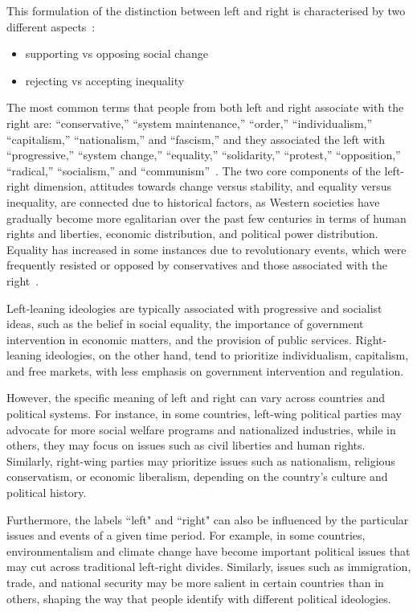 This formulation of the distinction between left and right is characterised by
two different aspects~\citep{jost2018political}:
\begin{itemize}
    \item supporting vs opposing social change
    \item rejecting vs accepting inequality
\end{itemize}
The most common terms that people from both left and right associate with the right are: “conservative,” “system maintenance,” “order,” “individualism,” “capitalism,” “nationalism,” and “fascism,” and they associated the left with “progressive,” “system change,” “equality,” “solidarity,” “protest,” “opposition,” “radical,” “socialism,” and “communism”~\citep[p.~213-14]{fuchs1990}.
The two core components of the left-right dimension, attitudes towards change versus stability, and equality versus inequality, are connected due to historical factors, as Western societies have gradually become more egalitarian over the past few centuries in terms of human rights and liberties, economic distribution, and political power distribution.
Equality has increased in some instances due to revolutionary events, which were frequently resisted or opposed by conservatives and those associated with the right~\cite{nosek2009politics,burke1790reflections}.



Left-leaning ideologies are typically associated with progressive and socialist ideas, such as the belief in social equality, the importance of government intervention in economic matters, and the provision of public services.
Right-leaning ideologies, on the other hand, tend to prioritize individualism, capitalism, and free markets, with less emphasis on government intervention and regulation.

However, the specific meaning of left and right can vary across countries and political systems.
For instance, in some countries, left-wing political parties may advocate for more social welfare programs and nationalized industries, while in others, they may focus on issues such as civil liberties and human rights.
Similarly, right-wing parties may prioritize issues such as nationalism, religious conservatism, or economic liberalism, depending on the country's culture and political history.

Furthermore, the labels ``left" and ``right" can also be influenced by the particular issues and events of a given time period.
For example, in some countries, environmentalism and climate change have become important political issues that may cut across traditional left-right divides.
Similarly, issues such as immigration, trade, and national security may be more salient in certain countries than in others, shaping the way that people identify with different political ideologies.





